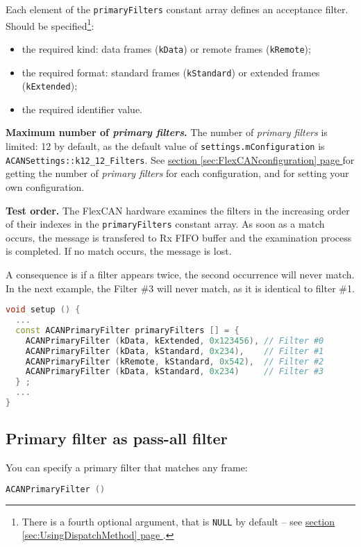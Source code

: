 \documentclass[10pt, a4paper, obeyspaces, openany]{extarticle}
\newcommand\refSectionPage[1]{\hyperref[sec:#1]{section \ref*{sec:#1} page \pageref{sec:#1}}}
\newcommand \subsectionLabel[2]{\subsection{#1}\label{subsec:#2}}
\begin{document}
Each element of the \texttt{primaryFilters} constant array defines an acceptance filter. Should be specified\footnote{There is a fourth optional argument, that is \texttt{NULL} by default -- see \refSectionPage{UsingDispatchMethod}.}:
\begin{itemize}
  \item the required kind: data frames (\texttt{kData}) or remote frames (\texttt{kRemote});
  \item the required format: standard frames (\texttt{kStandard}) or extended frames (\texttt{kExtended});
  \item the required identifier value.
\end{itemize}


{\bf Maximum number of \emph{primary filters}.} The number of \emph{primary filters} is limited: 12 by default, as the default value of \texttt{settings.mConfiguration} is \texttt{ACANSettings::k12\_12\_Filters}. See \refSectionPage{FlexCANconfiguration} for getting the number of \emph{primary filters} for each configuration, and for setting your own configuration.

{\bf Test order.} The FlexCAN hardware examines the filters in the increasing order of their indexes in the \texttt{primaryFilters} constant array. As soon as a match occurs, the message is transfered to Rx FIFO buffer and the examination process is completed. If no match occurs, the message is lost.

A consequence is if a filter appears twice, the second occurrence will never match. In the next example, the Filter \#3 will never match, as it is identical to filter \#1.

{ \small\begin{lstlisting}[language=c++]
void setup () {
  ...
  const ACANPrimaryFilter primaryFilters [] = {
    ACANPrimaryFilter (kData, kExtended, 0x123456), // Filter #0
    ACANPrimaryFilter (kData, kStandard, 0x234),    // Filter #1
    ACANPrimaryFilter (kRemote, kStandard, 0x542),  // Filter #2
    ACANPrimaryFilter (kData, kStandard, 0x234)     // Filter #3
  } ;
  ...
}
\end{lstlisting}}



\subsectionLabel{Primary filter as pass-all filter}{passAllPrimaryFilter}

You can specify a primary filter that matches any frame: 
{ \small\begin{lstlisting}[language=c++]
    ACANPrimaryFilter ()
\end{lstlisting}}
\end{document}
